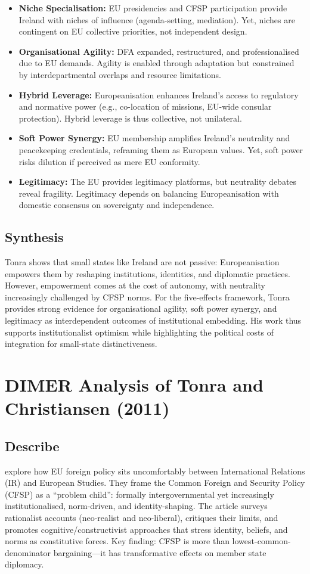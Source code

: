 \begin{itemize}
	\item \textbf{Niche Specialisation:} EU presidencies and CFSP participation provide Ireland with niches of influence (agenda-setting, mediation). Yet, niches are contingent on EU collective priorities, not independent design.
	\item \textbf{Organisational Agility:} DFA expanded, restructured, and professionalised due to EU demands. Agility is enabled through adaptation but constrained by interdepartmental overlaps and resource limitations.
	\item \textbf{Hybrid Leverage:} Europeanisation enhances Ireland’s access to regulatory and normative power (e.g., co-location of missions, EU-wide consular protection). Hybrid leverage is thus collective, not unilateral.
	\item \textbf{Soft Power Synergy:} EU membership amplifies Ireland’s neutrality and peacekeeping credentials, reframing them as European values. Yet, soft power risks dilution if perceived as mere EU conformity.
	\item \textbf{Legitimacy:} The EU provides legitimacy platforms, but neutrality debates reveal fragility. Legitimacy depends on balancing Europeanisation with domestic consensus on sovereignty and independence.
\end{itemize}

\subsection*{Synthesis}
Tonra shows that small states like Ireland are not passive: Europeanisation empowers them by reshaping institutions, identities, and diplomatic practices. However, empowerment comes at the cost of autonomy, with neutrality increasingly challenged by CFSP norms. For the five-effects framework, Tonra provides strong evidence for organisational agility, soft power synergy, and legitimacy as interdependent outcomes of institutional embedding. His work thus supports institutionalist optimism while highlighting the political costs of integration for small-state distinctiveness.

\section*{DIMER Analysis of Tonra and Christiansen (2011)}

\subsection*{Describe}
\textcite{TONRA_2011} explore how EU foreign policy sits uncomfortably between International Relations (IR) and European Studies. They frame the Common Foreign and Security Policy (CFSP) as a “problem child”: formally intergovernmental yet increasingly institutionalised, norm-driven, and identity-shaping. The article surveys rationalist accounts (neo-realist and neo-liberal), critiques their limits, and promotes cognitive/constructivist approaches that stress identity, beliefs, and norms as constitutive forces. Key finding: CFSP is more than lowest-common-denominator bargaining—it has transformative effects on member state diplomacy.

